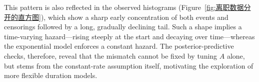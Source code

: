 This pattern is also reflected in the observed histograms (Figure~\ref{fig:离职数据分开的直方图}), which show a sharp early concentration of both events and censorings followed by a long, gradually declining tail. Such a shape implies a time-varying hazard—rising steeply at the start and decaying over time—whereas the exponential model enforces a constant hazard. The posterior-predictive checks, therefore, reveal that the mismatch cannot be fixed by tuning $A$ alone, but stems from the constant-rate assumption itself, motivating the exploration of more flexible duration models.